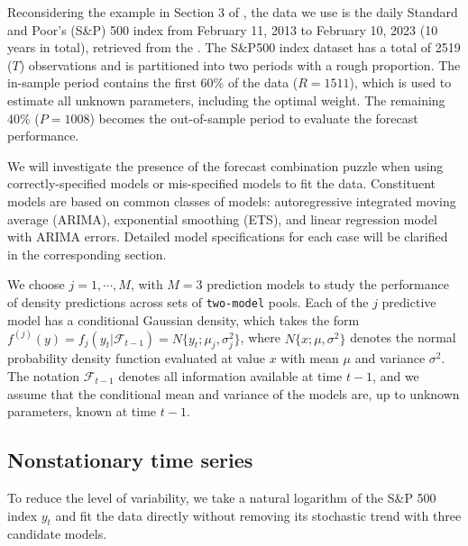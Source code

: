 \documentclass{monashthesis}
\begin{document}
Reconsidering the example in Section 3 of \textcite{GA11}, the data we use is the daily Standard and Poor's (S\&P) 500 index from February 11, 2013 to February 10, 2023 (10 years in total), retrieved from the \textcite{SP500}. The S\&P500 index dataset has a total of 2519 (\(T\)) observations and is partitioned into two periods with a rough proportion. The in-sample period contains the first 60\% of the data (\(R = 1511\)), which is used to estimate all unknown parameters, including the optimal weight. The remaining 40\% (\(P = 1008\)) becomes the out-of-sample period to evaluate the forecast performance.

We will investigate the presence of the forecast combination puzzle when using correctly-specified models or mis-specified models to fit the data. Constituent models are based on common classes of models: autoregressive integrated moving average (ARIMA), exponential smoothing (ETS), and linear regression model with ARIMA errors. Detailed model specifications for each case will be clarified in the corresponding section.

We choose \(j=1,\cdots,M\), with \(M=3\) prediction models to study the performance of density predictions across sets of \texttt{two-model} pools. Each of the \(j\) predictive model has a conditional Gaussian density, which takes the form \(f^{(j)}(y)=f_j(y_t|\mathcal{F}_{t-1})=N\{y_t; \mu_j, \sigma^2_j\}\), where \(N\{x; \mu, \sigma^2\}\) denotes the normal probability density function evaluated at value \(x\) with mean \(\mu\) and variance \(\sigma^2\). The notation \(\mathcal{F}_{t-1}\) denotes all information available at time \(t-1\), and we assume that the conditional mean and variance of the models are, up to unknown parameters, known at time \(t-1\).

\hypertarget{nonstationary-time-series}{%
\subsection{Nonstationary time series}\label{nonstationary-time-series}}

To reduce the level of variability, we take a natural logarithm of the S\&P 500 index \(y_t\) and fit the data directly without removing its stochastic trend with three candidate models.
\end{document}

